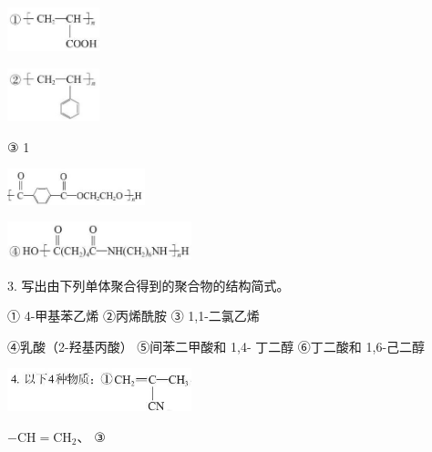 \documentclass[10pt]{article}
\begin{document}
\begin{center}
\includegraphics[max width=0.2\textwidth]{images/0190efc5-b58a-7c43-bfb0-e0a030df9cfd_140_443506.jpg}
\end{center}

\begin{center}
\includegraphics[max width=0.2\textwidth]{images/0190efc5-b58a-7c43-bfb0-e0a030df9cfd_140_769902.jpg}
\end{center}

③ 1

\begin{center}
\includegraphics[max width=0.3\textwidth]{images/0190efc5-b58a-7c43-bfb0-e0a030df9cfd_140_440963.jpg}
\end{center}

\begin{center}
\includegraphics[max width=0.4\textwidth]{images/0190efc5-b58a-7c43-bfb0-e0a030df9cfd_140_333507.jpg}
\end{center}

3. 写出由下列单体聚合得到的聚合物的结构简式。

① 4-甲基苯乙烯 ②丙烯酰胺 ③ 1,1-二氯乙烯

④乳酸（2-羟基丙酸） ⑤间苯二甲酸和 1,4- 丁二醇 ⑥丁二酸和 1,6-己二醇

\begin{center}
\includegraphics[max width=0.4\textwidth]{images/0190efc5-b58a-7c43-bfb0-e0a030df9cfd_140_533402.jpg}
\end{center}

\(- \mathrm{{CH}} = {\mathrm{{CH}}}_{2}\text{、}\) ③
\end{document}
